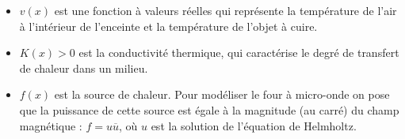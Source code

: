 \begin{itemize}

    \item $v(x)$ est une fonction à valeurs réelles qui représente la température
    de l'air à l'intérieur de l'enceinte et la température de l'objet à cuire.

    \item $K(x) > 0$ est la conductivité thermique, qui caractérise le degré de
    transfert de chaleur dans un milieu.

    \item $f(x)$ est la source de chaleur. Pour modéliser le four
    à micro-onde on pose que la puissance de cette source est égale à la
    magnitude (au carré) du champ magnétique : $f = u \overline{u}$,
    où $u$ est la solution de l'équation de Helmholtz.

\end{itemize}
